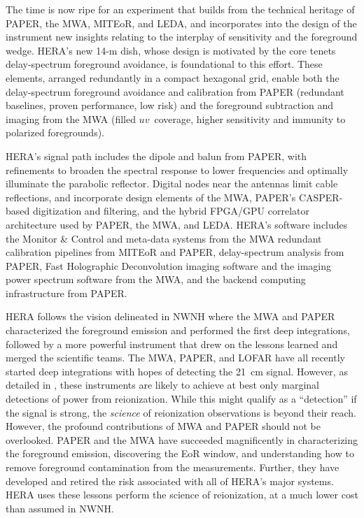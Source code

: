 \documentclass[preprint]{aastex}
\begin{document}
The time is now ripe for an experiment that builds from the technical heritage
of PAPER, the MWA, MITEoR, and LEDA, and incorporates into the design of the
instrument new insights relating to the interplay of sensitivity and the
foreground wedge.  HERA's new 14-m dish, whose design is motivated by the core
tenets delay-spectrum foreground avoidance, is foundational to this effort.
These elements, arranged redundantly in a compact hexagonal grid, enable both the
delay-spectrum foreground avoidance and calibration from PAPER (redundant
baselines, proven performance, low risk) and the foreground subtraction and
imaging from the MWA (filled $uv$~coverage, higher sensitivity and immunity to
polarized foregrounds).

HERA's signal path includes the dipole and balun from PAPER, with refinements
to broaden the spectral response to lower frequencies and optimally illuminate
the parabolic reflector.  Digital nodes near the antennas limit cable
reflections, and incorporate design elements of the MWA, PAPER's CASPER-based
digitization and filtering, and the hybrid FPGA/GPU correlator architecture
used by PAPER, the MWA, and LEDA.  HERA's software includes the Monitor \&
Control and meta-data systems from the MWA
redundant calibration pipelines from MITEoR and PAPER, delay-spectrum analysis from PAPER, Fast
Holographic Deconvolution imaging software
\citep{sullivan_et_al2012_trunc} and the imaging power spectrum
software from the MWA, and the backend computing infrastructure from PAPER.

HERA follows the vision delineated in NWNH where the MWA and PAPER
characterized the foreground emission and performed the first deep
integrations, followed by a more powerful instrument that drew on the lessons
learned and merged the scientific teams. The MWA, PAPER, and LOFAR have all
recently started deep integrations with hopes of detecting the 21~cm
signal.
However, as detailed in
\cite{pober_et_al2014}, these instruments are likely to achieve
at best only marginal detections of power from reionization.
While this might qualify as a ``detection'' if the signal is strong, the
\emph{science} of reionization observations is beyond their reach. 
However, the profound contributions of MWA and PAPER should not be overlooked. PAPER and the MWA have succeeded magnificently in characterizing the foreground emission, discovering the EoR window, and understanding how to remove foreground contamination from the measurements. Further, they have developed and retired the risk associated with all of HERA's major systems. 
HERA uses these lessons perform the science of reionization, at a much lower cost than assumed in NWNH.
\end{document}
